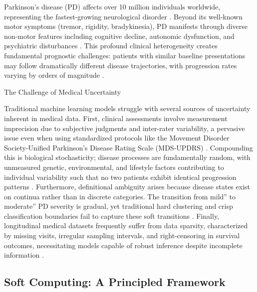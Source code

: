 \documentclass[conference]{IEEEtran}
\begin{document}
Parkinson's disease (PD) affects over 10 million individuals worldwide, representing the fastest-growing neurological disorder \cite{dorsey2018parkinsons}. Beyond its well-known motor symptoms (tremor, rigidity, bradykinesia), PD manifests through diverse non-motor features including cognitive decline, autonomic dysfunction, and psychiatric disturbances \cite{schapira2017nonmotor}. This profound clinical heterogeneity creates fundamental prognostic challenges: patients with similar baseline presentations may follow dramatically different disease trajectories, with progression rates varying by orders of magnitude \cite{fereshtehnejad2017clinical}.

The Challenge of Medical Uncertainty

Traditional machine learning models struggle with several sources of uncertainty inherent in medical data. First, clinical assessments involve measurement imprecision due to subjective judgments and inter-rater variability, a pervasive issue even when using standardized protocols like the Movement Disorder Society-Unified Parkinson's Disease Rating Scale (MDS-UPDRS) \cite{goetz2008movement}. Compounding this is biological stochasticity; disease processes are fundamentally random, with unmeasured genetic, environmental, and lifestyle factors contributing to individual variability such that no two patients exhibit identical progression patterns \cite{poewe2017parkinson}. Furthermore, definitional ambiguity arises because disease states exist on continua rather than in discrete categories. The transition from mild'' to moderate'' PD severity is gradual, yet traditional hard clustering and crisp classification boundaries fail to capture these soft transitions \cite{kuncheva2010fuzzy}. Finally, longitudinal medical datasets frequently suffer from data sparsity, characterized by missing visits, irregular sampling intervals, and right-censoring in survival outcomes, necessitating models capable of robust inference despite incomplete information \cite{marek2011ppmi}.

\subsection{Soft Computing: A Principled Framework}
\end{document}
